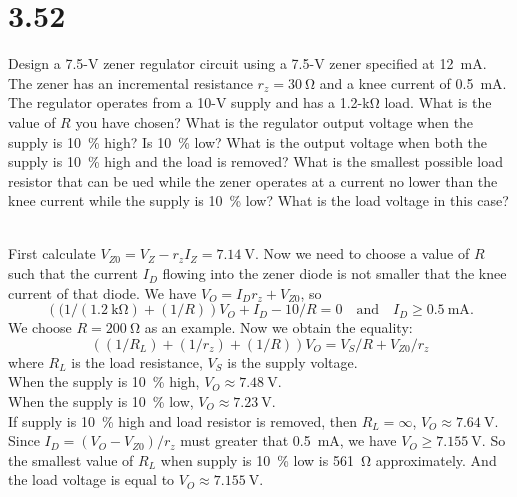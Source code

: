 \documentclass[12pt, a4paper]{article}
\begin{document}
\section{3.52}
Design a 7.5-\si{\V} zener regulator circuit using a 7.5-\si{\V}
zener specified at \SI{12}{\mA}. The zener has an incremental
resistance $r_z = \SI{30}{\ohm}$ and a knee current of \SI{0.5}{\mA}.
The regulator operates from a 10-\si{\V} supply and has a
1.2-\si{\kohm} load. What is the value of $R$ you have chosen?
What is the regulator output voltage when the supply is \SI{10}{\percent}
high? Is \SI{10}{\percent} low? What is the output voltage when both the
supply is \SI{10}{\percent} high and the load is removed? What is
the smallest possible load resistor that can be ued while the zener
operates at a current no lower than the knee current while the supply
is \SI{10}{\percent} low? What is the load voltage in this case?

\Ans \\
First calculate $V_{Z0} = V_Z - r_z I_Z = \SI{7.14}{\V}$. Now we need to
choose a value of $R$ such that the current $I_D$ flowing into the zener diode
is not smaller that the knee current of that diode. We have
$V_O = I_Dr_z + V_{Z0}$, so
\[
  \left((1/(\SI{1.2}{\kohm}) + (1/R)\right) V_O + I_D - 10/R = 0
    \quad \text{and} \quad I_D \ge \SI{0.5}{\mA}.
\]
We choose $R = \SI{200}{\ohm}$ as an example.
Now we obtain the equality:
\[ \left((1/R_L) + (1/r_z) + (1/R)\right)V_O = V_S/R + V_{Z0}/r_z \]
where $R_L$ is the load resistance, $V_S$ is the supply voltage. \\
When the supply is \SI{10}{\percent} high, $V_O \approx \SI{7.48}{\V}$. \\
When the supply is \SI{10}{\percent} low, $V_O \approx \SI{7.23}{\V}$. \\
If supply is \SI{10}{\percent} high and load resistor is removed,
then $R_L = \infty$, $V_O \approx \SI{7.64}{\V}$.
Since $I_D = (V_O - V_{Z0})/r_z$ must greater that \SI{0.5}{\mA}, we have
$V_O \ge \SI{7.155}{\V}$. So the smallest value of $R_L$ when supply is
\SI{10}{\percent} low is \SI{561}{\ohm} approximately. And the load voltage
is equal to $V_O \approx \SI{7.155}{\V}$.

\end{document}

